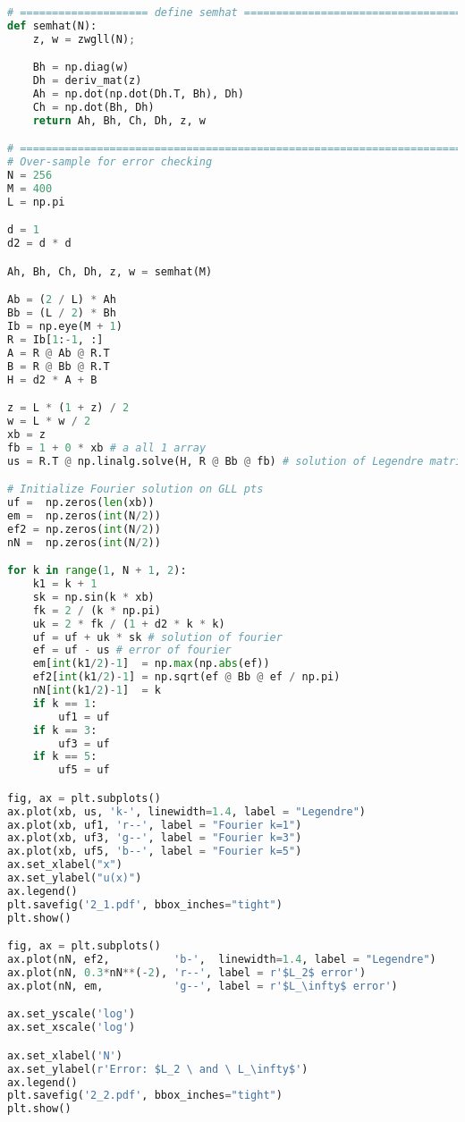 \documentclass[11pt,letterpaper]{article}
\begin{document}
\begin{lstlisting}[language=Python, caption=Question 2 Python code]
# ==================== define semhat ==================================
def semhat(N):
    z, w = zwgll(N);

    Bh = np.diag(w)
    Dh = deriv_mat(z)
    Ah = np.dot(np.dot(Dh.T, Bh), Dh)
    Ch = np.dot(Bh, Dh)
    return Ah, Bh, Ch, Dh, z, w

# =====================================================================
# Over-sample for error checking
N = 256
M = 400
L = np.pi

d = 1
d2 = d * d

Ah, Bh, Ch, Dh, z, w = semhat(M)

Ab = (2 / L) * Ah
Bb = (L / 2) * Bh
Ib = np.eye(M + 1)
R = Ib[1:-1, :]
A = R @ Ab @ R.T
B = R @ Bb @ R.T
H = d2 * A + B

z = L * (1 + z) / 2
w = L * w / 2
xb = z
fb = 1 + 0 * xb # a all 1 array
us = R.T @ np.linalg.solve(H, R @ Bb @ fb) # solution of Legendre matrix Hx = R @ Bb @ fb

# Initialize Fourier solution on GLL pts
uf =  np.zeros(len(xb))
em =  np.zeros(int(N/2))
ef2 = np.zeros(int(N/2))
nN =  np.zeros(int(N/2))

for k in range(1, N + 1, 2):
    k1 = k + 1
    sk = np.sin(k * xb)
    fk = 2 / (k * np.pi)
    uk = 2 * fk / (1 + d2 * k * k)
    uf = uf + uk * sk # solution of fourier
    ef = uf - us # error of fourier
    em[int(k1/2)-1]  = np.max(np.abs(ef))
    ef2[int(k1/2)-1] = np.sqrt(ef @ Bb @ ef / np.pi)
    nN[int(k1/2)-1]  = k
    if k == 1:
        uf1 = uf
    if k == 3:
        uf3 = uf
    if k == 5:
        uf5 = uf

fig, ax = plt.subplots()
ax.plot(xb, us, 'k-', linewidth=1.4, label = "Legendre")
ax.plot(xb, uf1, 'r--', label = "Fourier k=1")
ax.plot(xb, uf3, 'g--', label = "Fourier k=3")
ax.plot(xb, uf5, 'b--', label = "Fourier k=5")
ax.set_xlabel("x")
ax.set_ylabel("u(x)")
ax.legend()
plt.savefig('2_1.pdf', bbox_inches="tight")
plt.show()

fig, ax = plt.subplots()
ax.plot(nN, ef2,          'b-',  linewidth=1.4, label = "Legendre")
ax.plot(nN, 0.3*nN**(-2), 'r--', label = r'$L_2$ error')
ax.plot(nN, em,           'g--', label = r'$L_\infty$ error')

ax.set_yscale('log')
ax.set_xscale('log')

ax.set_xlabel('N')
ax.set_ylabel(r'Error: $L_2 \ and \ L_\infty$')
ax.legend()
plt.savefig('2_2.pdf', bbox_inches="tight")
plt.show()

    \end{lstlisting}
\end{document}
